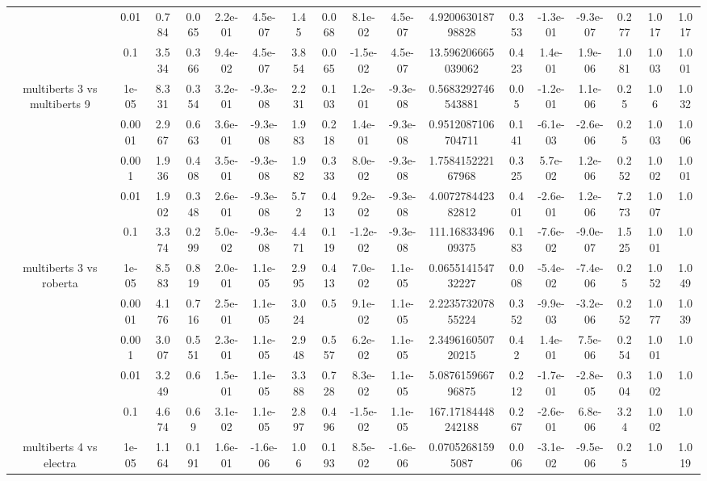 \begin{tabular}{|c|c|c|c|c|c|c|c|c|c|c|c|c|c|c|c|c|}
 & 0.01 & 0.784 & 0.065 & 2.2e-01 & 4.5e-07 & 1.45 & 0.068 & 8.1e-02 & 4.5e-07 & 4.920063018798828 & 0.353 & -1.3e-01 & -9.3e-07 & 0.277 & 1.017 & 1.017 \\
 & 0.1 & 3.534 & 0.366 & 9.4e-02 & 4.5e-07 & 3.854 & 0.065 & -1.5e-02 & 4.5e-07 & 13.596206665039062 & 0.423 & 1.4e-01 & 1.9e-06 & 1.081 & 1.003 & 1.001 \\
\hline
\multirow{5}{*}{multiberts 3 vs multiberts 9} & 1e-05 & 8.331 & 0.354 & 3.2e-01 & -9.3e-08 & 2.231 & 0.103 & 1.2e-01 & -9.3e-08 & 0.5683292746543881 & 0.05 & -1.2e-01 & 1.1e-06 & 0.25 & 1.06 & 1.032 \\
 & 0.0001 & 2.967 & 0.663 & 3.6e-01 & -9.3e-08 & 1.983 & 0.218 & 1.4e-01 & -9.3e-08 & 0.9512087106704711 & 0.141 & -6.1e-03 & -2.6e-06 & 0.25 & 1.003 & 1.006 \\
 & 0.001 & 1.936 & 0.408 & 3.5e-01 & -9.3e-08 & 1.982 & 0.333 & 8.0e-02 & -9.3e-08 & 1.758415222167968 & 0.325 & 5.7e-02 & 1.2e-06 & 0.252 & 1.002 & 1.001 \\
 & 0.01 & 1.902 & 0.348 & 2.6e-01 & -9.3e-08 & 5.72 & 0.413 & 9.2e-02 & -9.3e-08 & 4.007278442382812 & 0.401 & -2.6e-01 & 1.2e-06 & 7.273 & 1.007 & 1.0 \\
 & 0.1 & 3.374 & 0.299 & 5.0e-02 & -9.3e-08 & 4.471 & 0.119 & -1.2e-02 & -9.3e-08 & 111.1683349609375 & 0.183 & -7.6e-02 & -9.0e-07 & 1.525 & 1.001 & 1.0 \\
\hline
\multirow{5}{*}{multiberts 3 vs roberta } & 1e-05 & 8.583 & 0.819 & 2.0e-01 & 1.1e-05 & 2.995 & 0.413 & 7.0e-02 & 1.1e-05 & 0.065514154732227 & 0.008 & -5.4e-02 & -7.4e-06 & 0.25 & 1.052 & 1.049 \\
 & 0.0001 & 4.176 & 0.716 & 2.5e-01 & 1.1e-05 & 3.024 & 0.5 & 9.1e-02 & 1.1e-05 & 2.223573207855224 & 0.352 & -9.9e-03 & -3.2e-06 & 0.252 & 1.077 & 1.039 \\
 & 0.001 & 3.007 & 0.551 & 2.3e-01 & 1.1e-05 & 2.948 & 0.557 & 6.2e-02 & 1.1e-05 & 2.349616050720215 & 0.42 & 1.4e-01 & 7.5e-06 & 0.254 & 1.001 & 1.0 \\
 & 0.01 & 3.249 & 0.6 & 1.5e-01 & 1.1e-05 & 3.388 & 0.728 & 8.3e-02 & 1.1e-05 & 5.087615966796875 & 0.212 & -1.7e-01 & -2.8e-05 & 0.304 & 1.002 & 1.0 \\
 & 0.1 & 4.674 & 0.69 & 3.1e-02 & 1.1e-05 & 2.897 & 0.496 & -1.5e-02 & 1.1e-05 & 167.17184448242188 & 0.267 & -2.6e-01 & 6.8e-06 & 3.24 & 1.002 & 1.0 \\
\hline
\multirow{5}{*}{multiberts 4 vs electra } & 1e-05 & 1.164 & 0.191 & 1.6e-01 & -1.6e-06 & 1.06 & 0.193 & 8.5e-02 & -1.6e-06 & 0.07052681595087 & 0.006 & -3.1e-02 & -9.5e-06 & 0.25 & 1.0 & 1.019 \\

\end{tabular}
